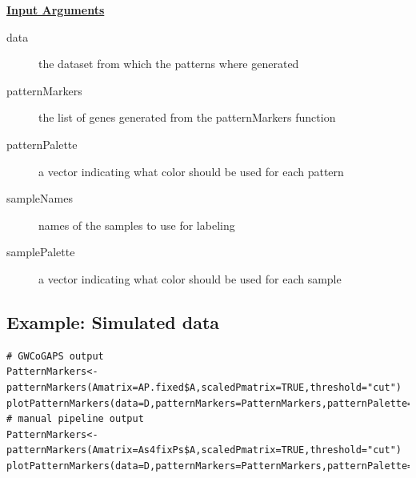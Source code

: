 \documentclass{report}
\begin{document}
\par \noindent \textbf{\underline{Input Arguments}}
\begin{description}
\item[data]{the dataset from which the patterns where generated}
\item[patternMarkers]{the list of genes generated from the patternMarkers function}
\item[patternPalette]{a vector indicating what color should be used for each pattern}
\item[sampleNames]{names of the samples to use for labeling }
\item[samplePalette]{a vector indicating what color should be used for each sample}
\end{description}

\subsection{Example: Simulated data}

\begin{verbatim}
# GWCoGAPS output
PatternMarkers<-patternMarkers(Amatrix=AP.fixed$A,scaledPmatrix=TRUE,threshold="cut")
plotPatternMarkers(data=D,patternMarkers=PatternMarkers,patternPalette=c("grey","navy","orange"))
# manual pipeline output
PatternMarkers<-patternMarkers(Amatrix=As4fixPs$A,scaledPmatrix=TRUE,threshold="cut")
plotPatternMarkers(data=D,patternMarkers=PatternMarkers,patternPalette=c("grey","navy","orange"))
\end{verbatim}
\end{document}
